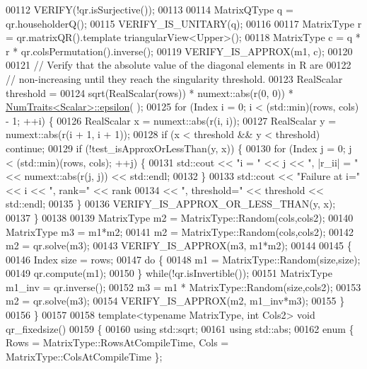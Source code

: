 \begin{DoxyCode}
00112   VERIFY(!qr.isSurjective());
00113 
00114   MatrixQType q = qr.householderQ();
00115   VERIFY\_IS\_UNITARY(q);
00116 
00117   MatrixType r = qr.matrixQR().template triangularView<Upper>();
00118   MatrixType c = q * r * qr.colsPermutation().inverse();
00119   VERIFY\_IS\_APPROX(m1, c);
00120 
00121   \textcolor{comment}{// Verify that the absolute value of the diagonal elements in R are}
00122   \textcolor{comment}{// non-increasing until they reach the singularity threshold.}
00123   RealScalar threshold =
00124       sqrt(RealScalar(rows)) * numext::abs(r(0, 0)) * \hyperlink{group___core___module_struct_eigen_1_1_num_traits}{NumTraits<Scalar>::epsilon}(
      );
00125   \textcolor{keywordflow}{for} (Index i = 0; i < (std::min)(rows, cols) - 1; ++i) \{
00126     RealScalar x = numext::abs(r(i, i));
00127     RealScalar y = numext::abs(r(i + 1, i + 1));
00128     \textcolor{keywordflow}{if} (x < threshold && y < threshold) \textcolor{keywordflow}{continue};
00129     \textcolor{keywordflow}{if} (!test\_isApproxOrLessThan(y, x)) \{
00130       \textcolor{keywordflow}{for} (Index j = 0; j < (std::min)(rows, cols); ++j) \{
00131         std::cout << \textcolor{stringliteral}{"i = "} << j << \textcolor{stringliteral}{", |r\_ii| = "} << numext::abs(r(j, j)) << std::endl;
00132       \}
00133       std::cout << \textcolor{stringliteral}{"Failure at i="} << i << \textcolor{stringliteral}{", rank="} << rank
00134                 << \textcolor{stringliteral}{", threshold="} << threshold << std::endl;
00135     \}
00136     VERIFY\_IS\_APPROX\_OR\_LESS\_THAN(y, x);
00137   \}
00138 
00139   MatrixType m2 = MatrixType::Random(cols,cols2);
00140   MatrixType m3 = m1*m2;
00141   m2 = MatrixType::Random(cols,cols2);
00142   m2 = qr.solve(m3);
00143   VERIFY\_IS\_APPROX(m3, m1*m2);
00144 
00145   \{
00146     Index size = rows;
00147     \textcolor{keywordflow}{do} \{
00148       m1 = MatrixType::Random(size,size);
00149       qr.compute(m1);
00150     \} \textcolor{keywordflow}{while}(!qr.isInvertible());
00151     MatrixType m1\_inv = qr.inverse();
00152     m3 = m1 * MatrixType::Random(size,cols2);
00153     m2 = qr.solve(m3);
00154     VERIFY\_IS\_APPROX(m2, m1\_inv*m3);
00155   \}
00156 \}
00157 
00158 \textcolor{keyword}{template}<\textcolor{keyword}{typename} MatrixType, \textcolor{keywordtype}{int} Cols2> \textcolor{keywordtype}{void} qr\_fixedsize()
00159 \{
00160   \textcolor{keyword}{using} std::sqrt;
00161   \textcolor{keyword}{using} std::abs;
00162   \textcolor{keyword}{enum} \{ Rows = MatrixType::RowsAtCompileTime, Cols = MatrixType::ColsAtCompileTime \};

\end{DoxyCode}
